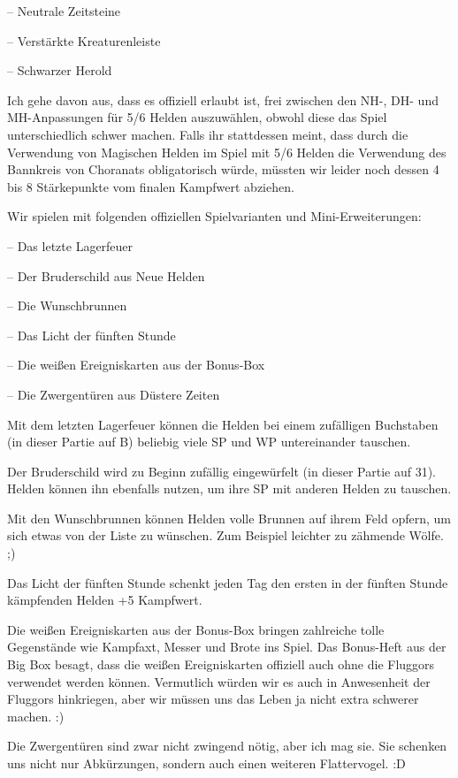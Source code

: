 \documentclass[10pt, a4paper, oneside]{book}
\begin{document}
{– Neutrale Zeitsteine

– Verstärkte Kreaturenleiste

– Schwarzer Herold



Ich gehe davon aus, dass es offiziell erlaubt ist, frei zwischen den NH-, DH- und MH-Anpassungen für 5/6 Helden auszuwählen, obwohl diese das Spiel unterschiedlich schwer machen. Falls ihr stattdessen meint, dass durch die Verwendung von Magischen Helden im Spiel mit 5/6 Helden die Verwendung des Bannkreis von Choranats obligatorisch würde, müssten wir leider noch dessen 4 bis 8 Stärkepunkte vom finalen Kampfwert abziehen.\bigskip



Wir spielen mit folgenden offiziellen Spielvarianten und Mini-Erweiterungen:

– Das letzte Lagerfeuer

– Der Bruderschild aus Neue Helden

– Die Wunschbrunnen

– Das Licht der fünften Stunde

– Die weißen Ereigniskarten aus der Bonus-Box

– Die Zwergentüren aus Düstere Zeiten



Mit dem letzten Lagerfeuer können die Helden bei einem zufälligen Buchstaben (in dieser Partie auf B) beliebig viele SP und WP untereinander tauschen.

Der Bruderschild wird zu Beginn zufällig eingewürfelt (in dieser Partie auf 31). Helden können ihn ebenfalls nutzen, um ihre SP mit anderen Helden zu tauschen.

Mit den Wunschbrunnen können Helden volle Brunnen auf ihrem Feld opfern, um sich etwas von der Liste zu wünschen. Zum Beispiel leichter zu zähmende Wölfe. ;)

Das Licht der fünften Stunde schenkt jeden Tag den ersten in der fünften Stunde kämpfenden Helden +5 Kampfwert.

Die weißen Ereigniskarten aus der Bonus-Box bringen zahlreiche tolle Gegenstände wie Kampfaxt, Messer und Brote ins Spiel. Das Bonus-Heft aus der Big Box besagt, dass die weißen Ereigniskarten offiziell auch ohne die Fluggors verwendet werden können. Vermutlich würden wir es auch in Anwesenheit der Fluggors hinkriegen, aber wir müssen uns das Leben ja nicht extra schwerer machen. :)

Die Zwergentüren sind zwar nicht zwingend nötig, aber ich mag sie. Sie schenken uns nicht nur Abkürzungen, sondern auch einen weiteren Flattervogel. :D\bigskip



}
\end{document}

